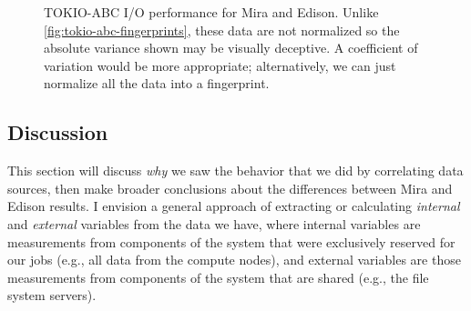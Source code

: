\documentclass[conference,10pt,compsocconf]{IEEEtran}
\begin{document}
\begin{figure}[h]
\centering
\caption{TOKIO-ABC I/O performance for Mira and Edison.  Unlike
\ref{fig:tokio-abc-fingerprints}, these data are not normalized so the
absolute variance shown may be visually deceptive.  A coefficient of variation
would be more appropriate; alternatively, we can just normalize all the data
into a fingerprint.}
\label{fig:tokio-abc-perf-boxplots}
\end{figure}

\subsection{Discussion} \label{discussion}

This section will discuss \emph{why} we saw the behavior that we did by
correlating data sources, then make broader conclusions about the differences
between Mira and Edison results.  I envision a general approach of extracting
or calculating \emph{internal} and \emph{external} variables from the data we
have, where internal variables are measurements from components of the system
that were exclusively reserved for our jobs (e.g., all data from the compute
nodes), and external variables are those measurements from components of the
system that are shared (e.g., the file system servers).
\end{document}
